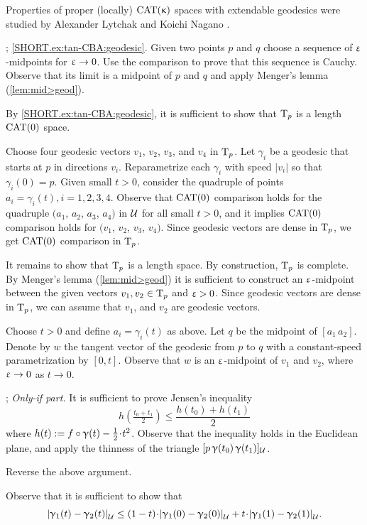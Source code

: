 Properties of proper (locally) $\mathrm{CAT}(\upkappa)$ spaces with extendable geodesics were studied by Alexander Lytchak and Koichi Nagano \cite{lytchak-nagano-2019}.

\parbf{\ref{ex:tan-CBA}}; \ref{SHORT.ex:tan-CBA:geodesic}.
Given two points $p$ and $q$ choose a sequence of $\upvarepsilon$-midpoints for $\eps\to 0$.
Use the comparison to prove that this sequence is Cauchy.
Observe that its limit is a midpoint of $p$ and $q$ and apply Menger's lemma (\ref{lem:mid>geod}).

By \ref{SHORT.ex:tan-CBA:geodesic}, it is sufficient to show that $\mathrm{T}_p$ is a length $\mathrm{CAT}(0)$ space.

Choose four geodesic vectors $v_1$, $v_2$, $v_3$, and $v_4$ in $\mathrm{T}_p$.
Let $\gamma_i$ be a geodesic that starts at $p$ in directions $v_i$.
Reparametrize each $\gamma_i$ with speed $|v_i|$ so that $\gamma_i(0)=p$.
Given small $t>0$, consider the quadruple of points $a_i=\gamma_i(t), i=1,2,3,4$.
Observe that $\mathrm{CAT}(0)$ comparison holds for the quadruple $(a_1$, $a_2$, $a_3$, $a_4)$ in $\mathcal{U}$ for all small $t>0$, and it implies $\mathrm{CAT}(0)$ comparison holds for $(v_1$, $v_2$, $v_3$, $v_4)$.
Since geodesic vectors are dense in $\mathrm{T}_p$, we get $\mathrm{CAT}(0)$ comparison in $\mathrm{T}_p$.

It remains to show that $\mathrm{T}_p$ is a length space.
By construction, $\mathrm{T}_p$ is complete.
By Menger's lemma (\ref{lem:mid>geod}) it is sufficient to construct
an $\upvarepsilon$-midpoint between the given vectors $v_1,v_2\in\T_p$ and $\upvarepsilon>0$.
Since geodesic vectors are dense in $\mathrm{T}_p$, we can assume that $v_1$, and $v_2$ are geodesic vectors.

Choose $t>0$ and define $a_i=\gamma_i(t)$ as above.
Let $q$ be the midpoint of $[a_1\,a_2]$.
Denote by $w$ the tangent vector of the geodesic from $p$ to $q$ with a constant-speed parametrization by $[0,t]$.
Observe that $w$ is an $\upvarepsilon$-midpoint of $v_1$ and $v_2$, where $\eps\to0$ as $t\to 0$.

\parbf{\ref{ex:convex-distfun}}; \textit{Only-if part.}
It is sufficient to prove Jensen's inequality
\[h(\tfrac{t_0+t_1}2)
\le
\frac{h(t_0)+h(t_1)}2\]
where $h(t)\df f\circ \gamma(t)-\tfrac12\cdot t^2$.
Observe that the inequality holds in the Euclidean plane, and 
apply the thinness of the triangle $[p\,\upgamma(t_0)\,\upgamma(t_1)]_{\mathcal{U}}$.

 Reverse the above argument.

Observe that it is sufficient to show that 
\[\dist{\gamma_1(t)}{\gamma_2(t)}{\spc{U}}\le (1-t)\cdot\dist{\gamma_1(0)}{\gamma_2(0)}{\spc{U}}+t\cdot \dist{\gamma_1(1)}{\gamma_2(1)}{\spc{U}}.\]

